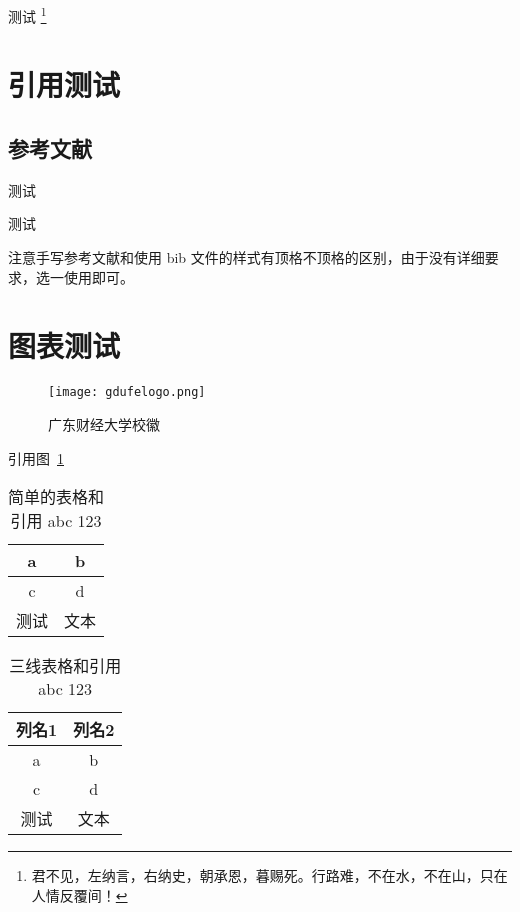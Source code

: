 测试 \footnote[3]{君不见，左纳言，右纳史，朝承恩，暮赐死。行路难，不在水，不在山，只在人情反覆间！}

\section{引用测试}

\subsection{参考文献}

测试 \cite{huangzh,anon-cn1,anon-cn2,anon-cn3,anon-cn4,anon-cn5}

测试 \cite*{anon-en1,anon-en2,anon-en3,anon-en4,anon-en5}

注意手写参考文献和使用 bib 文件的样式有顶格不顶格的区别，由于没有详细要求，选一使用即可。

\section{图表测试}

\begin{figure}[ht]
    \centering
    \texttt{[image: gdufelogo.png]}
    \caption{广东财经大学校徽}
    \label{fig:广东财经大学校徽}
\end{figure}

引用图~\ref{fig:广东财经大学校徽}

\begin{table}[ht]
    \centering
    \caption{%
        简单的表格和引用 abc 123 %
    }
    \label{table:简单的表格}
    \begin{tabular}{cc}
        \hline
        a  & b  \\ \hline
        c  & d  \\ \hline
        测试 & 文本 \\ \hline
    \end{tabular}
\end{table}

\begin{table}[ht]
    \centering
    \caption{%
        三线表格和引用 abc 123 %
    }
    \label{table:三线表格}
    \begin{tabular}{cc}
        \toprule
        列名1 & 列名2 \\ \midrule
        a   & b   \\
        c   & d   \\
        测试  & 文本  \\ \bottomrule
    \end{tabular}
\end{table}

